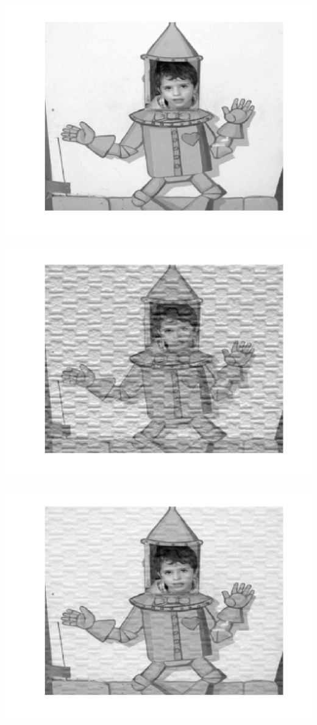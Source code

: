 \begin{center}
\begin{minipage}{0.33\linewidth}
\includegraphics[width=0.9\linewidth]{images/source1.png}
\end{minipage}%
\hfill
\begin{minipage}{0.33\linewidth}
\includegraphics[width=0.9\linewidth]{images/mixed1.png}
\end{minipage}
\hfill
\begin{minipage}{0.33\linewidth}
\includegraphics[width=0.9\linewidth]{images/separated1.png}

\end{minipage}
\end{center}
